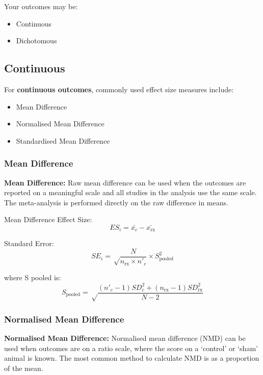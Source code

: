 \documentclass[
]{book}
\begin{document}
Your outcomes may be:

\begin{itemize}
\item
  Continuous
\item
  Dichotomous
\end{itemize}

\hypertarget{continuous}{%
\subsection{Continuous}\label{continuous}}

For \textbf{continuous outcomes}, commonly used effect size measures include:

\begin{itemize}
\item
  Mean Difference
\item
  Normalised Mean Difference
\item
  Standardised Mean Difference
\end{itemize}

\hypertarget{mean-difference}{%
\subsubsection{Mean Difference}\label{mean-difference}}

\textbf{Mean Difference:} Raw mean difference can be used when the outcomes are reported on a meaningful scale and all studies in the analysis use the same scale. The meta-analysis is performed directly on the raw difference in means.

Mean Difference Effect Size:
\[ ES_i = \bar{x_c} - \bar{x_\text{rx}}\]

Standard Error:
\[ SE_i = \sqrt \frac {N}{n_{\text{rx}} \times n'_c} \times S_{\text{pooled}}^2 \]

where S pooled is:
\[S_{\text{pooled}} = \sqrt \frac {(n'_c - 1)SD_c^2 + (n_{\text{rx}} - 1)SD_{\text{rx}}^2}{N -2} \]

\hypertarget{normalised-mean-difference}{%
\subsubsection{Normalised Mean Difference}\label{normalised-mean-difference}}

\textbf{Normalised Mean Difference:} Normalised mean difference (NMD) can be used when outcomes are on a ratio scale, where the score on a `control' or `sham' animal is known. The most common method to calculate NMD is as a proportion of the mean.
\end{document}
